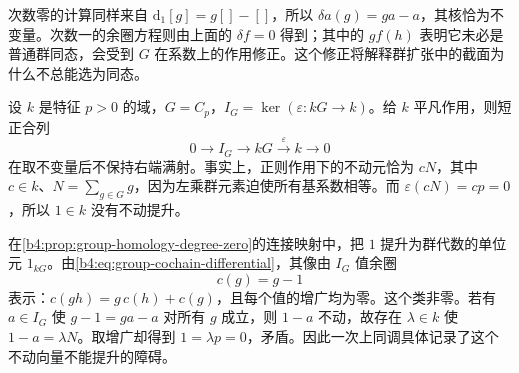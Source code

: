 次数零的计算同样来自 \(\mathrm{d}_1[g]=g[]-[]\)，所以 \(\delta a(g)=ga-a\)，其核恰为不变量。次数一的余圈方程则由上面的 \(\delta f=0\) 得到；其中的 \(g f(h)\) 表明它未必是普通群同态，会受到 \(G\) 在系数上的作用修正。这个修正将解释群扩张中的截面为什么不总能选为同态。

\begin{example}\label{b4:exm:modular-augmentation-obstruction}
	设 \(k\) 是特征 \(p>0\) 的域，\(G=C_p\)，\(I_G=\ker(\varepsilon:kG\to k)\)。给 \(k\) 平凡作用，则短正合列
	\[
		0\longrightarrow I_G\longrightarrow kG\xrightarrow{\varepsilon}k\longrightarrow0
	\]
	在取不变量后不保持右端满射。事实上，正则作用下的不动元恰为 \(cN\)，其中 \(c\in k\)、\(N=\sum_{g\in G}g\)，因为左乘群元素迫使所有基系数相等。而 \(\varepsilon(cN)=cp=0\)，所以 \(1\in k\) 没有不动提升。

	\ProseParagraphBreak
	在\cref{b4:prop:group-homology-degree-zero}的连接映射中，把 \(1\) 提升为群代数的单位元 \(1_{kG}\)。由\eqref{b4:eq:group-cochain-differential}，其像由 \(I_G\) 值余圈
	\[
		c(g)=g-1
	\]
	表示：\(c(gh)=g\,c(h)+c(g)\)，且每个值的增广均为零。这个类非零。若有 \(a\in I_G\) 使 \(g-1=ga-a\) 对所有 \(g\) 成立，则 \(1-a\) 不动，故存在 \(\lambda\in k\) 使 \(1-a=\lambda N\)。取增广却得到 \(1=\lambda p=0\)，矛盾。因此一次上同调具体记录了这个不动向量不能提升的障碍。
\end{example}
